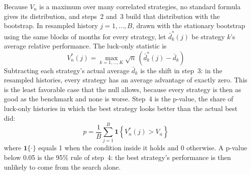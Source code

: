Because $V_n$ is a maximum over many correlated strategies, no standard formula gives its distribution, and steps~2 and~3 build that distribution with the bootstrap. In resampled history $j = 1, \dots, B$, drawn with the stationary bootstrap using the same blocks of months for every strategy, let $\bar{d}_k^{*}(j)$ be strategy $k$'s average relative performance. The luck-only statistic is
\begin{equation}
  V_n^{*}(j) = \max_{k = 1, \dots, K} \sqrt{n}\, \left(\bar{d}_k^{*}(j) - \bar{d}_k\right)
  \label{eq:03-rc-boot}
\end{equation}
Subtracting each strategy's actual average $\bar{d}_k$ is the shift in step~3: in the resampled histories, every strategy has an average advantage of exactly zero. This is the least favorable case that the null allows, because every strategy is then as good as the benchmark and none is worse. Step~4 is the p-value, the share of luck-only histories in which the best strategy looks better than the actual best did:
\begin{equation}
  p = \frac{1}{B} \sum_{j=1}^{B} \mathbf{1}\left\{ V_n^{*}(j) > V_n \right\}
  \label{eq:03-rc-p}
\end{equation}
where $\mathbf{1}\{\cdot\}$ equals 1 when the condition inside it holds and 0 otherwise. A p-value below 0.05 is the 95\% rule of step~4: the best strategy's performance is then unlikely to come from the search alone.

